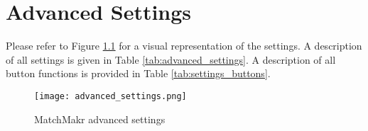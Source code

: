 \chapter{Advanced Settings}


\renewcommand{\arraystretch}{1}
\renewcommand{\pb}[1]{\parbox[t]{0.15\textwidth}{#1}}




%
%
Please refer to Figure \ref{fig:advanced_settings} for a visual representation of the settings.  A description of all settings is given in Table \ref{tab:advanced_settings}.  A description of all button functions is provided in Table \ref{tab:settings_buttons}.



%
%
\begin{figure}
	\centering
	\texttt{[image: advanced\_settings.png]}
	\caption{\label{fig:advanced_settings} MatchMakr advanced settings}
\end{figure}


